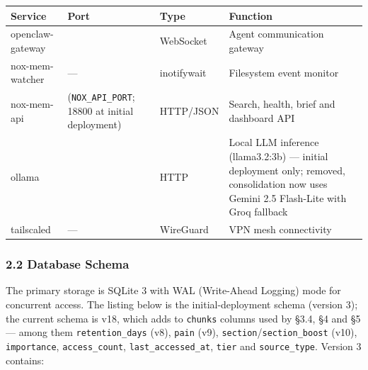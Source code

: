 \documentclass[
]{article}
\newcounter{none} %
\begin{document}
{\def\LTcaptype{none} %
\begin{longtable}[]{@{}
  >{\raggedright\arraybackslash}p{}
  >{\raggedright\arraybackslash}p{}
  >{\raggedright\arraybackslash}p{}
  >{\raggedright\arraybackslash}p{}@{}}
\toprule\noalign{}
\begin{minipage}[b]{\linewidth}\raggedright
Service
\end{minipage} & \begin{minipage}[b]{\linewidth}\raggedright
Port
\end{minipage} & \begin{minipage}[b]{\linewidth}\raggedright
Type
\end{minipage} & \begin{minipage}[b]{\linewidth}\raggedright
Function
\end{minipage} \\
\midrule\noalign{}
\endhead
\bottomrule\noalign{}
\endlastfoot
openclaw-gateway & 18789 & WebSocket & Agent communication gateway \\
nox-mem-watcher & --- & inotifywait & Filesystem event monitor \\
nox-mem-api & 18802 (\texttt{NOX\_API\_PORT}; 18800 at initial
deployment) & HTTP/JSON & Search, health, brief and dashboard API \\
ollama & 11434 & HTTP & Local LLM inference (llama3.2:3b) --- initial
deployment only; removed, consolidation now uses Gemini 2.5 Flash-Lite
with Groq fallback \\
tailscaled & --- & WireGuard & VPN mesh connectivity \\
\end{longtable}
}

\subsubsection{2.2 Database Schema}\label{database-schema}

The primary storage is SQLite 3 with WAL (Write-Ahead Logging) mode for
concurrent access. The listing below is the initial-deployment schema
(version 3); the current schema is v18, which adds to \texttt{chunks}
columns used by §3.4, §4 and §5 --- among them \texttt{retention\_days}
(v8), \texttt{pain} (v9), \texttt{section}/\texttt{section\_boost}
(v10), \texttt{importance}, \texttt{access\_count},
\texttt{last\_accessed\_at}, \texttt{tier} and \texttt{source\_type}.
Version 3 contains:
\end{document}
